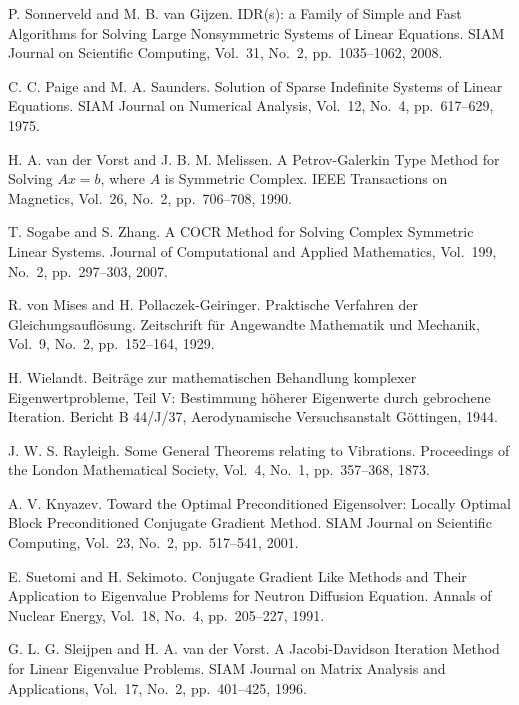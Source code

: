 \documentclass[a4paper]{article}
\begin{document}
\begin{thebibliography}{10}
P. Sonnerveld and M. B. van Gijzen.
\newblock IDR(s): a Family of Simple and Fast Algorithms for Solving Large Nonsymmetric Systems of Linear Equations.
\newblock SIAM Journal on Scientific Computing, Vol.~31, No.~2, pp.\ 1035--1062, 2008.

C. C. Paige and M. A. Saunders.
\newblock Solution of Sparse Indefinite Systems of Linear Equations.
\newblock SIAM Journal on Numerical Analysis, Vol.~12, No.~4, pp.\ 617--629, 1975.

H. A. van der Vorst and J. B. M. Melissen.
\newblock A Petrov-Galerkin Type Method for Solving $Ax=b$, where $A$ is Symmetric Complex.
\newblock IEEE Transactions on Magnetics, Vol.~26, No.~2, pp.\ 706--708, 1990.

T. Sogabe and S. Zhang.
\newblock A COCR Method for Solving Complex Symmetric Linear Systems.
\newblock Journal of Computational and Applied Mathematics, Vol.~199, No.~2, pp.\ 297--303, 2007.

R. von Mises and H. Pollaczek-Geiringer.
\newblock Praktische Verfahren der Gleichungsaufl\"osung.
\newblock Zeitschrift f\"ur Angewandte Mathematik und Mechanik, Vol.~9,
	No.~2, pp.\ 152--164, 1929.

H. Wielandt.
\newblock Beitr\"age zur mathematischen Behandlung komplexer
	Eigenwertprobleme, Teil V: Bestimmung h\"oherer Eigenwerte durch
	gebrochene Iteration.
\newblock Bericht B 44/J/37, Aerodynamische Versuchsanstalt G\"ottingen, 1944.

J. W. S. Rayleigh.
\newblock Some General Theorems relating to Vibrations.
\newblock Proceedings of the London Mathematical Society, Vol.~4, No.~1,
	pp.\ 357--368, 1873.

A. V. Knyazev.
\newblock Toward the Optimal Preconditioned Eigensolver: Locally Optimal
	Block Preconditioned Conjugate Gradient Method.
\newblock SIAM Journal on Scientific Computing, Vol.~23, No.~2, pp.\ 517--541, 2001.

E. Suetomi and H. Sekimoto.
\newblock Conjugate Gradient Like Methods and Their Application to
	Eigenvalue Problems for Neutron Diffusion Equation.
\newblock Annals of Nuclear Energy, Vol.~18, No.~4, pp.\ 205--227, 1991.

G. L. G. Sleijpen and H. A. van der Vorst.
\newblock A Jacobi-Davidson Iteration Method for Linear Eigenvalue Problems.
\newblock SIAM Journal on Matrix Analysis and Applications, Vol.~17, No.~2, pp.\ 401--425, 1996.


\end{thebibliography}
\end{document}
